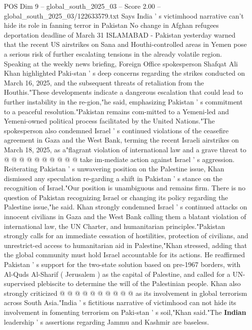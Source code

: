 \begin{textsample}{POS Dim 9 – global\_south\_2025\_03 – Score 2.00 – global\_south\_2025\_03/122633579.txt}  \label{ex:f9_pos_051}
Says India ' s victimhood narrative can't hide its role in fanning terror in Pakistan No change in Afghan refugees deportation deadline of March 31 ISLAMABAD - Pakistan yesterday warned that the recent US airstrikes on Sana and Houthi-controlled areas in Yemen pose a serious risk of further escalating tensions in the already volatile region.
Speaking at the weekly news briefing, Foreign Office spokesperson Shafqat Ali Khan highlighted Paki-stan ' s deep concerns regarding the strikes conducted on March 16, 2025, and the subsequent threats of retaliation from the Houthis."These developments indicate a dangerous escalation that could lead to further instability in the re-gion,"he said, emphasizing Pakistan ' s commitment to a peaceful resolution."Pakistan remains com-mitted to a Yemeni-led and Yemeni-owned political process facilitated by the United Nations."The spokesperson also condemned Israel ' s continued violations of the ceasefire agreement in Gaza and the West Bank, terming the recent Israeli airstrikes on March 18, 2025, as a"flagrant violation of international law and a grave threat to @ @ @ @ @ @ @ @ @ @ take im-mediate action against Israel ' s aggression.
Reiterating Pakistan ' s unwavering position on the Palestine issue, Khan dismissed any speculation re-garding a shift in Pakistan ' s stance on the recognition of Israel."Our position is unambiguous and remains firm.
There is no question of Pakistan recognizing Israel or changing its policy regarding the Palestine issue,"he said.
Khan strongly condemned Israel ' s continued attacks on innocent civilians in Gaza and the West Bank calling them a blatant violation of international law, the UN Charter, and humanitarian principles."Pakistan strongly calls for an immediate cessation of hostilities, protection of civilians, and unrestrict-ed access to humanitarian aid in Palestine,"Khan stressed, adding that the global community must hold Israel accountable for its actions.
He reaffirmed Pakistan ' s support for the two-state solution based on pre-1967 borders, with Al-Quds Al-Sharif ( Jerusalem ) as the capital of Palestine, and called for a UN-supervised plebiscite to determine the will of the Palestinian people.
Khan also strongly criticized @ @ @ @ @ @ @ @ @ @ as its involvement in global terrorism across South Asia."India ' s fictitious narrative of victimhood can not hide its involvement in fomenting terrorism on Paki-stan ' s soil,"Khan said."The \textbf{Indian} leadership ' s assertions regarding Jammu and Kashmir are baseless.

\end{textsample}

